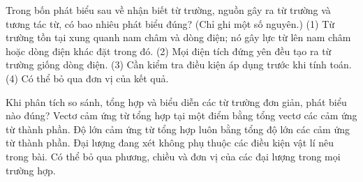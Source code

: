\begin{ex}
Trong bốn phát biểu sau về nhận biết từ trường, nguồn gây ra từ trường và tương tác từ, có bao nhiêu phát biểu đúng? (Chỉ ghi một số nguyên.) (1) Từ trường tồn tại xung quanh nam châm và dòng điện; nó gây lực từ lên nam châm hoặc dòng điện khác đặt trong đó. (2) Mọi điện tích đứng yên đều tạo ra từ trường giống dòng điện. (3) Cần kiểm tra điều kiện áp dụng trước khi tính toán. (4) Có thể bỏ qua đơn vị của kết quả.
\end{ex}

\begin{ex}
Khi phân tích so sánh, tổng hợp và biểu diễn các từ trường đơn giản, phát biểu nào đúng?
\choice
{\True Vectơ cảm ứng từ tổng hợp tại một điểm bằng tổng vectơ các cảm ứng từ thành phần.}
{Độ lớn cảm ứng từ tổng hợp luôn bằng tổng độ lớn các cảm ứng từ thành phần.}
{Đại lượng đang xét không phụ thuộc các điều kiện vật lí nêu trong bài.}
{Có thể bỏ qua phương, chiều và đơn vị của các đại lượng trong mọi trường hợp.}
\end{ex}


